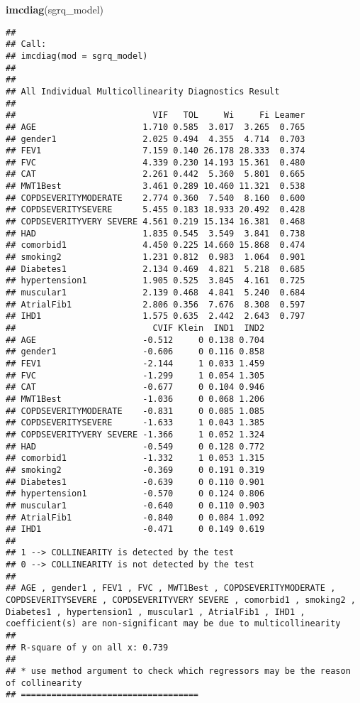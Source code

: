 \documentclass[
]{article}
\newenvironment{Shaded}{\begin{snugshade}}{\end{snugshade}}
\newcommand{\FunctionTok}[1]{\textcolor[rgb]{0.13,0.29,0.53}{\textbf{#1}}}
\newcommand{\NormalTok}[1]{#1}
\begin{document}
\begin{Shaded}
\begin{Highlighting}[]
\FunctionTok{imcdiag}\NormalTok{(sgrq\_model)}
\end{Highlighting}
\end{Shaded}

\begin{verbatim}
## 
## Call:
## imcdiag(mod = sgrq_model)
## 
## 
## All Individual Multicollinearity Diagnostics Result
## 
##                           VIF   TOL     Wi     Fi Leamer
## AGE                     1.710 0.585  3.017  3.265  0.765
## gender1                 2.025 0.494  4.355  4.714  0.703
## FEV1                    7.159 0.140 26.178 28.333  0.374
## FVC                     4.339 0.230 14.193 15.361  0.480
## CAT                     2.261 0.442  5.360  5.801  0.665
## MWT1Best                3.461 0.289 10.460 11.321  0.538
## COPDSEVERITYMODERATE    2.774 0.360  7.540  8.160  0.600
## COPDSEVERITYSEVERE      5.455 0.183 18.933 20.492  0.428
## COPDSEVERITYVERY SEVERE 4.561 0.219 15.134 16.381  0.468
## HAD                     1.835 0.545  3.549  3.841  0.738
## comorbid1               4.450 0.225 14.660 15.868  0.474
## smoking2                1.231 0.812  0.983  1.064  0.901
## Diabetes1               2.134 0.469  4.821  5.218  0.685
## hypertension1           1.905 0.525  3.845  4.161  0.725
## muscular1               2.139 0.468  4.841  5.240  0.684
## AtrialFib1              2.806 0.356  7.676  8.308  0.597
## IHD1                    1.575 0.635  2.442  2.643  0.797
##                           CVIF Klein  IND1  IND2
## AGE                     -0.512     0 0.138 0.704
## gender1                 -0.606     0 0.116 0.858
## FEV1                    -2.144     1 0.033 1.459
## FVC                     -1.299     1 0.054 1.305
## CAT                     -0.677     0 0.104 0.946
## MWT1Best                -1.036     0 0.068 1.206
## COPDSEVERITYMODERATE    -0.831     0 0.085 1.085
## COPDSEVERITYSEVERE      -1.633     1 0.043 1.385
## COPDSEVERITYVERY SEVERE -1.366     1 0.052 1.324
## HAD                     -0.549     0 0.128 0.772
## comorbid1               -1.332     1 0.053 1.315
## smoking2                -0.369     0 0.191 0.319
## Diabetes1               -0.639     0 0.110 0.901
## hypertension1           -0.570     0 0.124 0.806
## muscular1               -0.640     0 0.110 0.903
## AtrialFib1              -0.840     0 0.084 1.092
## IHD1                    -0.471     0 0.149 0.619
## 
## 1 --> COLLINEARITY is detected by the test 
## 0 --> COLLINEARITY is not detected by the test
## 
## AGE , gender1 , FEV1 , FVC , MWT1Best , COPDSEVERITYMODERATE , COPDSEVERITYSEVERE , COPDSEVERITYVERY SEVERE , comorbid1 , smoking2 , Diabetes1 , hypertension1 , muscular1 , AtrialFib1 , IHD1 , coefficient(s) are non-significant may be due to multicollinearity
## 
## R-square of y on all x: 0.739 
## 
## * use method argument to check which regressors may be the reason of collinearity
## ===================================
\end{verbatim}
\end{document}
